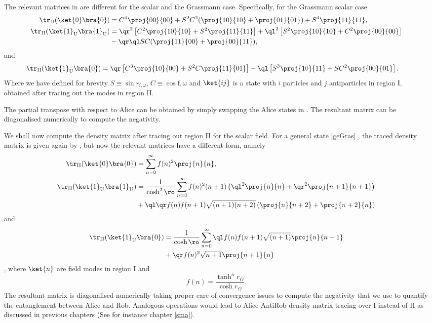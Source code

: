 The relevant matrices in  are different for the scalar and the Grassmann case. Specifically, for the Grassmann scalar case
\begin{align}\tr_\text{II}(\ket{0}\bra{0})&=C^4\proj{00}{00}+S^2C^2(\proj{10}{10}+\proj{01}{01})+S^4\proj{11}{11},\nonumber\\\tr_\text{II}(\ket{1}_\text{U}\bra{1}_\text{U})&=\qr^2\left[C^2\proj{10}{10}+S^2\proj{11}{11}\right]+\ql^2\left[S^2\proj{10}{10}+C^2\proj{00}{00}\right]\nonumber\\
&-\qr\ql SC(\proj{11}{00}+\proj{00}{11}),\end{align}
and
\begin{align}\tr_\text{II}(\ket{1}_\text{U}\bra{0})&=\qr\left[C^3\proj{10}{00}+S^2C\proj{11}{01}\right]-\ql\left[S^3\proj{10}{11}+SC^2\proj{00}{01}\right].\end{align}
Where we have defined for brevity $S\equiv\sin r_{\text{f},\omega}$, $C\equiv\cos{\text{f},\omega}$ and $\ket{ij}$ is a state with $i$ particles and $j$ antiparticles in region I, obtained after tracing out the modes in region II.

The partial transpose with respect to Alice can be obtained by simply swapping the Alice states in . The resultant matrix can be diagonalised numerically to compute the negativity.

We shall now compute the density matrix after tracing out region II for the scalar field. For a general state \eqref{geGras} , the traced density matrix is given again by , but now the relevant matrices have a different form, namely
\begin{align}\nonumber\tr_\text{II}(\ket{0}\bra{0})&=\sum_{n=0}^\infty f(n)^2\proj{n}{n},\\\tr_\text{II}(\ket{1}_\text{U}\bra{1}_\text{U})&=\frac{1}{\cosh^2\ro}\sum_{n=0}^\infty f(n)^2(n+1)\left(\ql^2\proj{n}{n}+\qr^2\proj{n+1}{n+1}\right)\nonumber\\&+
\ql\qr f(n)f(n+1)\sqrt{(n+1)(n+2)}\left(\proj{n}{n+2}+\proj{n+2}{n}\right)\end{align}
and
\begin{align}\tr_\text{II}(\ket{1}_\text{U}\bra{0})&=\frac{1}{\cosh\ro}\sum_{n=0}^\infty \ql f(n)f(n+1)\sqrt{(n+1)}\proj{n}{n+1}\nonumber\\&+\qr f(n)^2\sqrt{n+1}\proj{n+1}{n}\end{align},
where $\ket{n}$ are field modes in region I and
\begin{equation}
f(n)=\frac{\tanh^n r_\Omega}{\cosh r_\Omega}.
\end{equation}
The resultant matrix is diagonalised numerically taking proper care of convergence issues to compute the negativity that we use to quantify the entanglement between Alice and Rob. Analogous operations would lead to Alice-AntiRob density matrix tracing over I instead of II as discussed in previous chapters (See for instance chapter \ref{sma}). 


